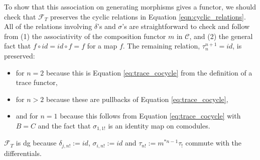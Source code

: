To show that this association on generating morphisms 
gives a functor, we should check that $\mathcal{F}_T$ 
preserves the cyclic relations in Equation 
\ref{eqn:cyclic_relations}. All of the relations involving 
$\delta$'s and $\sigma$'s are straightforward to 
check and follow from (1) the associativity of the composition 
functor $m$ in $\mathcal{C}$, and (2) the general fact that 
$f \circ id = id \circ f = f$ for a map $f$. The 
remaining relation, $\tau_n^{n+1} = id$, is preserved:
\begin{itemize}
	\item for $n=2$ because this is Equation 
	\ref{eq:trace_cocycle} from the definition of a 
	trace functor,
	\item for $n>2$ because these are pullbacks of 
	Equation \ref{eq:trace_cocycle},
	\item and for $n=1$ because this follows from 
	Equation \ref{eq:trace_cocycle} with $B=C$ and 
	the fact that $\sigma_{1,1!}$ is an identity 
	map on comodules.
\end{itemize}
$\mathcal{F}_T$ is dg because $\delta_{j,n!} := id$, 
$\sigma_{i,n!} := id$ and $\tau_{n!} := m^{*n-1} \tau_!$
commute with the differentials.

